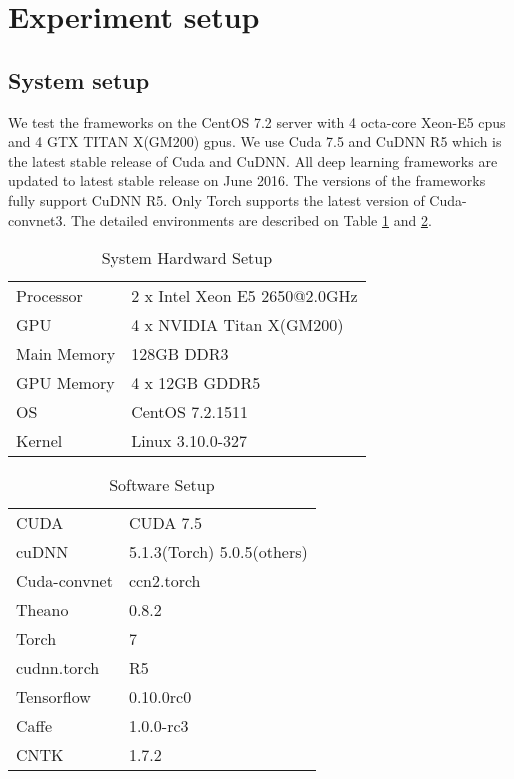 \section{Experiment setup}

\subsection{System setup}
We test the frameworks on the CentOS 7.2 server with 4 octa-core Xeon-E5 cpus and 4 GTX TITAN X(GM200) gpus.
We use Cuda 7.5 and CuDNN R5 which is the latest stable release of Cuda and CuDNN.
All deep learning frameworks are updated to latest stable release on June 2016.
The versions of the frameworks fully support CuDNN R5.
Only Torch supports the latest version of Cuda-convnet3.
The detailed environments are described on Table \ref{table_system} and \ref{table_software}.

\begin{table}[]
\centering
\caption{System Hardward Setup}
\label{table_system}
\begin{tabular}{ll}
Processor   & 2 x Intel Xeon E5 2650@2.0GHz \\
GPU         & 4 x NVIDIA Titan X(GM200)     \\
Main Memory & 128GB DDR3                    \\
GPU Memory  & 4 x 12GB GDDR5                \\
OS          & CentOS 7.2.1511               \\
Kernel      & Linux 3.10.0-327             
\end{tabular}
\end{table}

\begin{table}[]
\centering
\caption{Software Setup}
\label{table_software}
\begin{tabular}{ll}
CUDA 		& CUDA 7.5 \\
cuDNN		& 5.1.3(Torch) \/ 5.0.5(others)     \\
Cuda-convnet& ccn2.torch			\\
Theano		& 0.8.2                    \\
Torch		& 7                \\
cudnn.torch	& R5		\\
Tensorflow	& 0.10.0rc0     	\\
Caffe		& 1.0.0-rc3			\\
CNTK		& 1.7.2             
\end{tabular}
\end{table}

